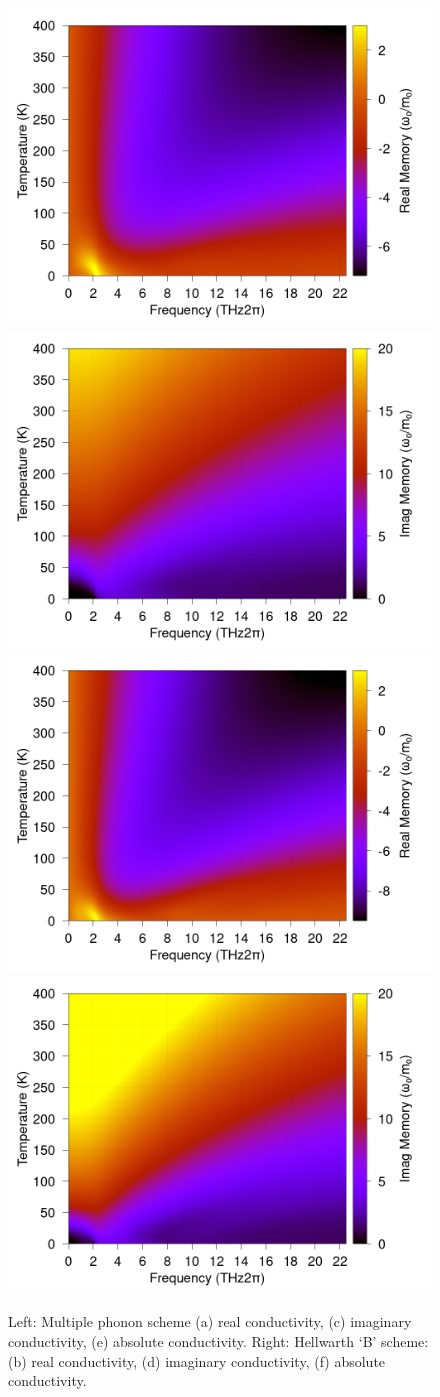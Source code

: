 \begin{figure}
    \centering
    \includegraphics[width=.49\textwidth]{figures/MAPI-single-real-memory-contourf.png}
    \includegraphics[width=.49\textwidth]{figures/MAPI-single-imag-memory-contourf.png}
    \includegraphics[width=.49\textwidth]{figures/MAPI-multi-real-memory-contourf.png}
    \includegraphics[width=.49\textwidth]{figures/MAPI-multi-imag-memory-contourf.png}
    \caption{Left: Multiple phonon scheme (a) real conductivity, (c) imaginary conductivity, (e) absolute conductivity. Right: Hellwarth `B' scheme: (b) real conductivity, (d) imaginary conductivity, (f) absolute conductivity.}
    \label{fig:multicontour}
\end{figure}


